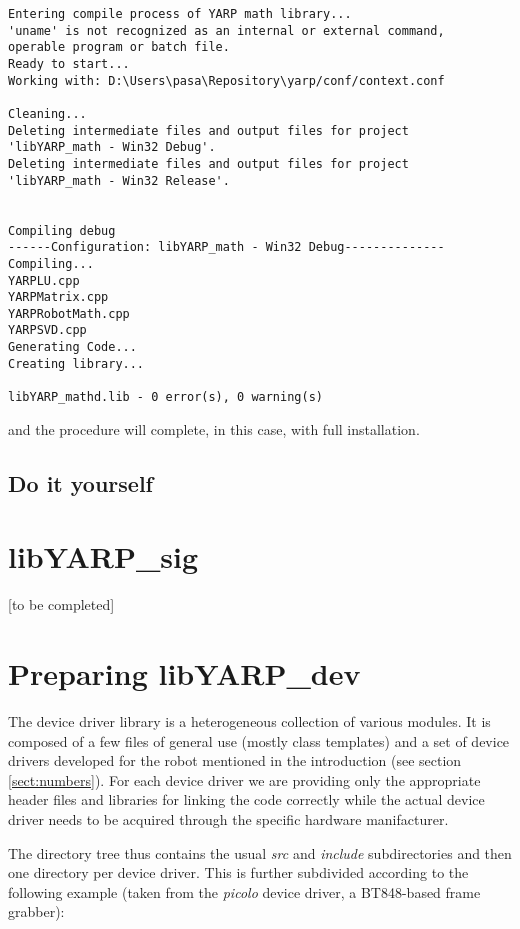 \begin{verbatim}
Entering compile process of YARP math library...
'uname' is not recognized as an internal or external command,
operable program or batch file.
Ready to start...
Working with: D:\Users\pasa\Repository\yarp/conf/context.conf

Cleaning...
Deleting intermediate files and output files for project 
'libYARP_math - Win32 Debug'.
Deleting intermediate files and output files for project 
'libYARP_math - Win32 Release'.


Compiling debug
------Configuration: libYARP_math - Win32 Debug--------------
Compiling...
YARPLU.cpp
YARPMatrix.cpp
YARPRobotMath.cpp
YARPSVD.cpp
Generating Code...
Creating library...

libYARP_mathd.lib - 0 error(s), 0 warning(s)
\end{verbatim}

\noindent and the procedure will complete, in this case, with full installation.


\subsection{Do it yourself}





\section{libYARP\_sig}
[to be completed]
 
 
\section{Preparing libYARP\_dev}
The device driver library is a heterogeneous collection of various modules. It is composed of a few files of general use (mostly class templates) and a set of device drivers developed for the robot mentioned in the introduction (see section \ref{sect:numbers}). For each device driver we are providing only the appropriate header files and libraries for linking the code correctly while the actual device driver needs to be acquired through the specific hardware manifacturer.

The directory tree thus contains the usual {\em src} and {\em include} subdirectories and then one directory per device driver. This is further subdivided according to the following example (taken from the {\em picolo} device driver, a BT848-based frame grabber):

